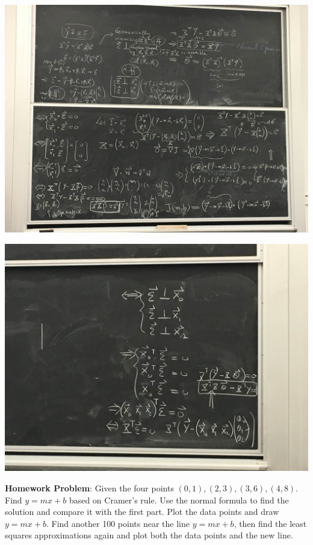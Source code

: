 \documentclass{article}
\begin{document}
\vspace{1pc} 
\centerline{\includegraphics[height=10cm]{LinReg01.JPG}}
\vspace{1pc}
\centerline{\includegraphics[height=10cm]{LinReg03.JPG}}
\vspace{1pc}

\noindent \textbf{Homework Problem}: Given the four points $(0,1), (2,3), (3,6), (4,8)$.  Find $y= mx + b$ based on Cramer's rule.  Use the normal formula to find the solution and compare it with the first part.  Plot the data points and draw $y=mx + b$.  Find another 100 points near the line $y=mx+b$, then find the least squares approximations again and plot both the data points and the new line.
\end{document}

